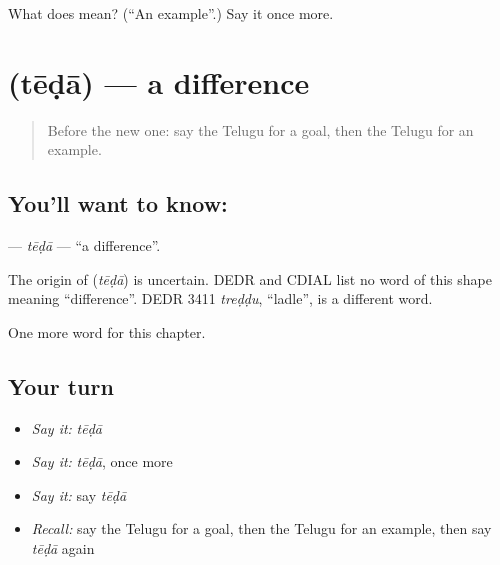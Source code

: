 \begin{tcolorbox}[breakable,colback=teal!4,colframe=teal!35!black,title={Before you move on}]
What does  mean? (\textquotedblleft{}An example\textquotedblright{}.) Say it once more.
\end{tcolorbox}
\section[\texorpdfstring{\te{తేడా} (tēḍā)}{తేడా (tēḍā)}]{ (tēḍā) — a difference}

\label{lesson:TE-C218-teda}



\begin{quote}
Before the new one: say the Telugu for a goal, then the Telugu for an example.
\end{quote}

\subsection*{You'll want to know: }
\textbf{} — \emph{tēḍā} — \textquotedblleft{}a difference\textquotedblright{}.

\begin{cousinweb}
The origin of \textbf{} (\emph{tēḍā}) is uncertain. DEDR and CDIAL list no word of this shape meaning \textquotedblleft{}difference\textquotedblright{}. DEDR 3411 \emph{treḍḍu}, \textquotedblleft{}ladle\textquotedblright{}, is a different word.
\end{cousinweb}

\begin{grammarlens}[title={What you've built}]
One more word for this chapter.
\end{grammarlens}

\subsection*{Your turn}
\begin{itemize}
\raggedright
  \item \emph{Say it:} \emph{tēḍā}
  \item \emph{Say it:} \emph{tēḍā}, once more
  \item \emph{Say it:} say \emph{tēḍā}
  \item \emph{Recall:} say the Telugu for a goal, then the Telugu for an example, then say \emph{tēḍā} again
\end{itemize}


